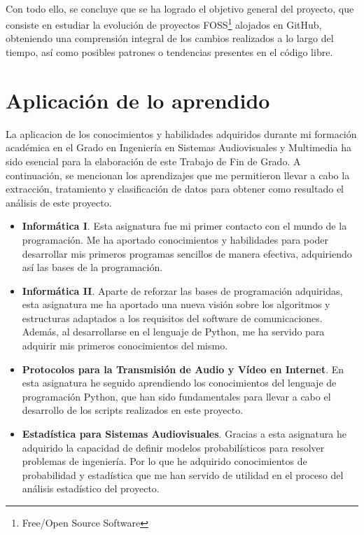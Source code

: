 \documentclass[a4paper, 12pt]{book}
\begin{document}
\\Con todo ello, se concluye que se ha logrado el objetivo general del proyecto, que consiste en estudiar la evolución de proyectos FOSS\footnote{Free/Open Source Software}
alojados en GitHub, obteniendo una comprensión integral de los cambios realizados a lo largo del tiempo, así como posibles patrones o tendencias  presentes en el código libre.

\section{Aplicación de lo aprendido}
\label{sec:aplicacion}

La aplicacion de los conocimientos y habilidades adquiridos durante mi formación académica en el Grado en Ingeniería en Sistemas Audiovisuales y Multimedia ha sido esencial para
la elaboración de este Trabajo de Fin de Grado. A continuación, se mencionan los aprendizajes que me permitieron llevar a cabo la extracción, tratamiento y clasificación de datos
para obtener como resultado el análisis de este proyecto.

\begin{itemize}
  \item \textbf{Informática I}. Esta asignatura fue mi primer contacto con el mundo de la programación. Me ha aportado conocimientos y habilidades para poder desarrollar mis primeros
  programas sencillos de manera efectiva, adquiriendo así las bases de la programación. 
  \item \textbf{Informática II}. Aparte de reforzar las bases de programación adquiridas, esta asignatura me ha aportado una nueva visión sobre los algoritmos y estructuras adaptados
  a los requisitos del software de comunicaciones. Además, al desarrollarse en el lenguaje de Python, me ha servido para adquirir mis primeros conocimientos del mismo.
  \item \textbf{Protocolos para la Transmisión de Audio y Vídeo en Internet}. En esta asignatura he seguido aprendiendo los conocimientos del lenguaje de programación Python, que han sido
  fundamentales para llevar a cabo el desarrollo de los scripts realizados en este proyecto. 
  \item \textbf{Estadística para Sistemas Audiovisuales}. Gracias a esta asignatura he adquirido la capacidad de definir modelos probabilísticos para resolver problemas de ingeniería.
  Por lo que he adquirido conocimientos de probabilidad y estadística que me han servido de utilidad en el proceso del análisis estadístico del proyecto.
\end{itemize}
\end{document}
